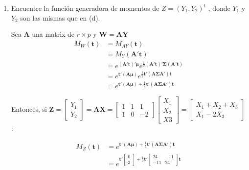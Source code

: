 \documentclass[12pt,a4paper]{report}
\begin{document}
\begin{enumerate}
\begin{enumerate}
La función de densidad conjunta de $Y_1$, $Y_2$ es:

$f(Y_1,Y_2)=\dfrac{1}{2\pi \sqrt{24}\sqrt{24}\sqrt{1-\dfrac{121}{576}}} \\ exp\left[ -\dfrac{1}{2\left(1-\dfrac{121}{576}\right)}\left[\left(\dfrac{Y_1-0}{\sqrt{24}}\right)^2 -2\dfrac{-11}{\sqrt{24}\sqrt{24}}\left(\dfrac{Y_1-0}{\sqrt{24}}\right)\left(\dfrac{Y_2-3}{\sqrt{24}}\right)+\left(\dfrac{Y_2-3}{\sqrt{24}}\right)^2\right]\right]$

\item Encuentre la función generadora de momentos de $Z = (Y_1, Y_2)^t$ , donde $Y_1$ y $Y_2$ son las mismas que en (d). 



Sea $\mathbf{A}$ una matrix de $r\times p$ y $\mathbf{W=AY}$ \begin{align*}
M_W(\mathbf{t})&=M_{AY}(\mathbf{t})\\
&=M_{Y}(\mathbf{A}' \mathbf{t})\\
&=e^{(\mathbf{A}' \mathbf{t})'\boldsymbol{\mu}}e^{\frac{1}{2}(\mathbf{A}' \mathbf{t})'\boldsymbol{\Sigma}(\mathbf{A}' \mathbf{t})}\\
&=e^{\mathbf{t}'(\mathbf{A}\boldsymbol{\mu})}e^{\frac{1}{2}\mathbf{t}'(\mathbf{A} 
\boldsymbol{\Sigma}\mathbf{A}') \mathbf{t}}\\
&=e^{\mathbf{t}'(\mathbf{A}\boldsymbol{\mu})+\frac{1}{2}\mathbf{t}'(\mathbf{A} 
\boldsymbol{\Sigma}\mathbf{A}') \mathbf{t}}
\end{align*}

Entonces, si $\mathbf{Z}=\begin{bmatrix} Y_1\\ Y_2 \end{bmatrix}=\mathbf{AX}=\begin{bmatrix} 1 & 1 & 1 \\ 1 & 0 & -2\end{bmatrix}\begin{bmatrix} X_1 \\ X_2 \\ X3 \end{bmatrix}=\begin{bmatrix} X_1+X_2+X_3 \\ X_1 -2X_3\end{bmatrix}$:


\begin{align*}
M_Z(\mathbf{t})&=e^{\mathbf{t}'(\mathbf{A}\boldsymbol{\mu})+\frac{1}{2}\mathbf{t}'(\mathbf{A} 
\boldsymbol{\Sigma}\mathbf{A}') \mathbf{t}}\\
&=e^{\mathbf{t}'\begin{bmatrix} 0\\ 3 \end{bmatrix}+\frac{1}{2}\mathbf{t}'\begin{bmatrix} 24 & -11\\ -11 & 24 \end{bmatrix} \mathbf{t}}
\end{align*}


\end{enumerate}
\end{enumerate}
\end{document}
